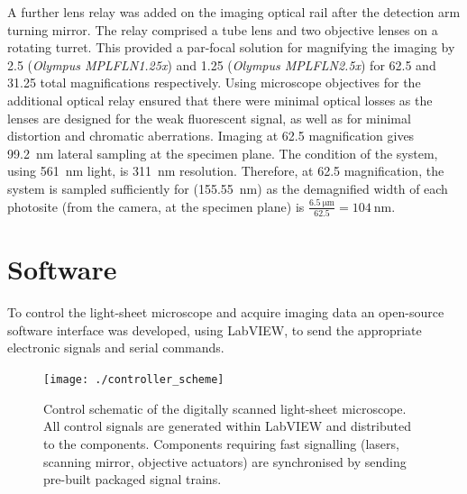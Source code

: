 A further lens relay was added on the \gls{imaging optical rail} after the \gls{detection arm} turning mirror.
The relay comprised a tube lens and two objective lenses on a rotating turret.
This provided a par-focal solution for magnifying the imaging by \SI{2.5}{\times} (\emph{Olympus MPLFLN1.25x}) and \SI{1.25}{\times} (\emph{Olympus MPLFLN2.5x}) for \SI{62.5}{\times} and \SI{31.25}{\times} total magnifications respectively.
Using microscope objectives for the additional optical relay ensured that there were minimal optical losses as the lenses are designed for the weak fluorescent signal, as well as for minimal distortion and chromatic aberrations.
Imaging at \SI{62.5}{\times} magnification gives \SI{99.2}{\nano\meter} lateral sampling at the specimen plane.
The  condition of the system, using \SI{561}{\nano\meter} light, is \SI{311}{\nano\meter} resolution.
Therefore, at \SI{62.5}{\times} magnification, the system is sampled sufficiently for  (\SI{155.55}{\nano\meter})
as the demagnified width of each \gls{photosite} (from the camera, at the specimen plane) is \(\frac{\SI{6.5}{\micro\meter}}{62.5}=\SI{104}{\nano\meter}\).

\section{Software}

To control the \gls{light-sheet} microscope and acquire imaging data an open-source~\cite{russellSpimcontroller2017} software interface was developed, using \gls{LabVIEW}, to
send the appropriate electronic signals and serial commands.

\begin{figure}
    \centering
  \texttt{[image: ./controller\_scheme]} %
  \caption[Control schematic of the digitally scanned light-sheet microscope]{
  Control schematic of the digitally scanned light-sheet microscope.
  All control signals are generated within \gls{LabVIEW} and distributed to the components.
  Components requiring fast signalling (lasers, scanning mirror, objective actuators) are synchronised by sending pre-built packaged signal trains.}\label{fig:control}
\end{figure}

